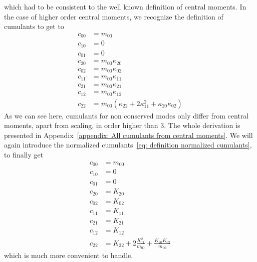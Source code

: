 which had to be consistent to the well known definition of central moments.
In the case of higher order central moments, we recognize the definition of cumulants to get to
\begin{equation}
  \label{eq: all central moments from cumulants}
  \begin{aligned}
    c_{00} & = m_{00} \\
    c_{10} & = 0 \\
    c_{01} & = 0 \\
    c_{20} & = m_{00}\kappa_{20} \\
    c_{02} & = m_{00}\kappa_{02} \\
    c_{11} & = m_{00}\kappa_{11} \\
    c_{21} & = m_{00}\kappa_{21} \\
    c_{12} & = m_{00}\kappa_{12} \\
    c_{22} & = m_{00}(\kappa_{22} + 2\kappa_{11}^2 + \kappa_{20}\kappa_{02})
  \end{aligned}
\end{equation}
As we can see here, cumulants for non conserved modes only differ from central moments, apart from scaling, in order higher than $3$. The whole derivation is presented in Appendix~\ref{appendix: All cumulants from central moments}.
We will again introduce the normalized cumulants~\eqref{eq: definition normalized cumulants}, to finally get
\begin{equation}
  \label{eq: all central moments from normalized cumulants}
  \begin{aligned}
    c_{00} & = m_{00}\\
    c_{10} & = 0 \\
    c_{01} & = 0 \\
    c_{20} & = K_{20} \\
    c_{02} & = K_{02} \\
    c_{11} & = K_{11} \\
    c_{21} & = K_{21} \\
    c_{12} & = K_{12} \\
    c_{22} & = K_{22} + 2 \frac{K_{11}^2}{m_{00}} + \frac{K_{20}K_{02}}{m_{00}}
  \end{aligned}
\end{equation}
which is much more convenient to handle.

